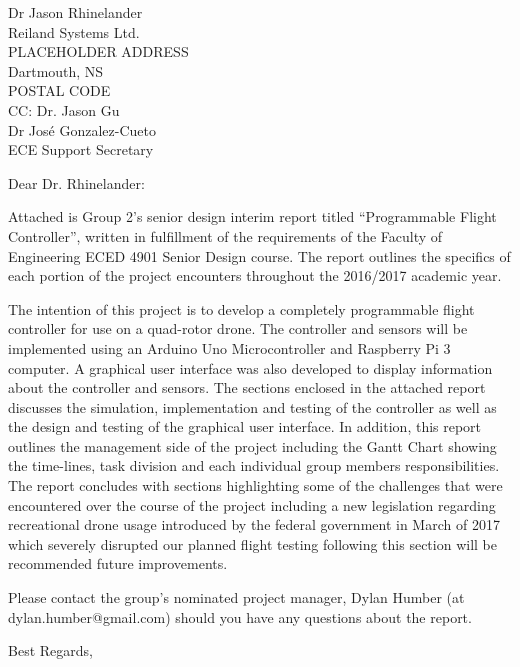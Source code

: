 \documentclass[letterpaper]{letter}
\begin{document}
\begin{letter}{Dr Jason Rhinelander \\ Reiland Systems Ltd. \\ PLACEHOLDER ADDRESS \\ Dartmouth, NS \\ POSTAL CODE \\ CC: Dr. Jason Gu \\ Dr Jos\'{e} Gonzalez-Cueto \\ ECE Support Secretary}	
\opening{Dear Dr. Rhinelander:}

Attached is Group 2’s senior design interim report titled “Programmable Flight Controller”, written in fulfillment of the requirements of the Faculty of Engineering ECED 4901 Senior Design course. The report outlines the specifics of each portion of the project encounters throughout the 2016/2017 academic year. 
	
The intention of this project is to develop a completely programmable flight controller for use on a quad-rotor drone. The controller and sensors will be implemented using an Arduino Uno Microcontroller and Raspberry Pi 3 computer. A graphical user interface was also developed to display information about the controller and sensors. The sections enclosed in the attached report discusses the simulation, implementation and testing of the controller as well as the design and testing of the graphical user interface. In addition, this report outlines the management side of the project including the Gantt Chart showing the time-lines, task division and each individual group members responsibilities. The report concludes with sections highlighting some of the challenges that were encountered over the course of the project including a new legislation regarding recreational drone usage introduced by the federal government in March of 2017 which severely disrupted our planned flight testing following this section will be recommended future improvements. 

Please contact the group’s nominated project manager, Dylan Humber (at  dylan.humber@gmail.com) should you have any questions about the report. 

\closing{Best Regards,}

\end{letter}
\end{document}
